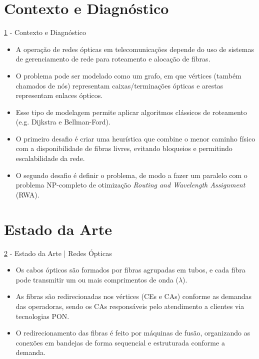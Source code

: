\documentclass[aspectratio=169,xcolor=dvipsnames]{beamer}
\begin{document}
\section{Contexto e Diagnóstico}\label{sec:contexto}
\begin{frame}{\ref{sec:contexto} - Contexto e Diagnóstico}
\begin{itemize}
  \item A operação de redes ópticas em telecomunicações depende do uso de sistemas de gerenciamento de rede para roteamento e alocação de fibras.
  \item O problema pode ser modelado como um grafo, em que vértices (também chamados de nós) representam caixas/terminações ópticas e arestas representam enlaces ópticos.
  \item Esse tipo de modelagem permite aplicar algoritmos clássicos de roteamento (e.g. Dijkstra e Bellman-Ford).
  \item O primeiro desafio é criar uma heurística que combine o menor caminho físico com a disponibilidade de fibras livres, evitando bloqueios e permitindo escalabilidade da rede.
  \item O segundo desafio é definir o problema, de modo a fazer um paralelo com o problema NP-completo de otimização \textit{Routing and Wavelength Assignment} (RWA).
\end{itemize}

\end{frame}

\section{Estado da Arte}\label{sec:estado_da_arte}
\begin{frame}{\ref{sec:estado_da_arte} - Estado da Arte | Redes Ópticas}
  \begin{itemize}
    \item Os cabos ópticos são formados por fibras agrupadas em tubos, e cada fibra pode transmitir um ou mais comprimentos de onda ($\lambda$).
    \item As fibras são redirecionadas nos vértices (CEs e CAs) conforme as demandas das operadoras, sendo os CAs responsáveis pelo atendimento a clientes via tecnologias PON.
    \item O redirecionamento das fibras é feito por máquinas de fusão, organizando as conexões em bandejas de forma sequencial e estruturada conforme a demanda.
  \end{itemize}
\end{frame}
\end{document}
